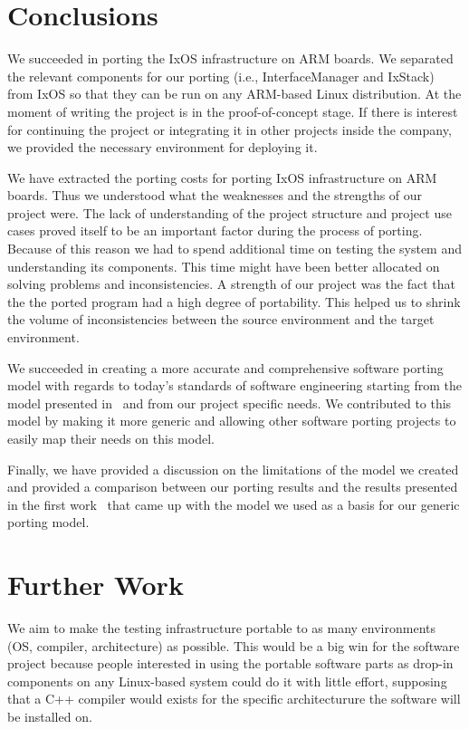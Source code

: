 \chapter{Conclusions} \label{sec:conclusions}

We succeeded in porting the IxOS infrastructure on ARM boards. We separated the
relevant components for our porting (i.e., InterfaceManager and IxStack) from
IxOS so that they can be run on any ARM-based Linux distribution. At the
moment of writing the project is in the proof-of-concept stage. If there is
interest for continuing the project or integrating it in other projects inside
the company, we provided the necessary environment for deploying it.

We have extracted the porting costs for porting IxOS infrastructure on ARM
boards. Thus we understood what the weaknesses and the strengths of our project
were. The lack of understanding of the project structure and project use cases
proved itself to be an important factor during the process of porting. Because
of this reason we had to spend additional time on testing the system and
understanding its components. This time might have been better allocated on
solving problems and inconsistencies. A strength of our project was the fact
that the the ported program had a high degree of portability. This helped us to
shrink the volume of inconsistencies between the source environment and the
target environment.

We succeeded in creating a more accurate and comprehensive software porting
model with regards to today's standards of software engineering starting from
the model presented in~\cite{hakuta,tanaka} and from our project specific needs.
We contributed to this model by making it more generic and allowing other
software porting projects to easily map their needs on this model.

Finally, we have provided a discussion on the limitations of the model we
created and provided a comparison between our porting results and the results
presented in the first work~\cite{hakuta} that came up with the model we used as a
basis for our generic porting model.

\chapter{Further Work}

We aim to make the testing infrastructure portable to as many environments (OS,
compiler, architecture) as possible. This would be a big win for the software
project because people interested in using the portable software parts as
drop-in components on any Linux-based system could do it with little effort,
supposing that a C++ compiler would exists for the specific architecturure the
software will be installed on.

